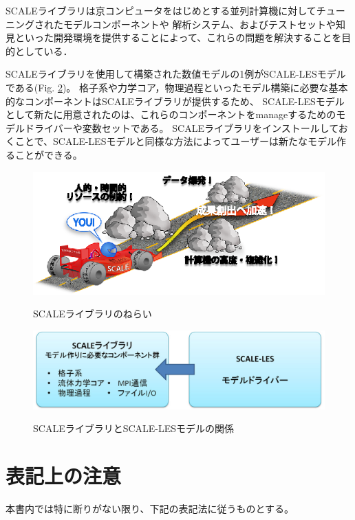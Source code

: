 SCALEライブラリは京コンピュータをはじめとする並列計算機に対してチューニングされたモデルコンポーネントや
解析システム、およびテストセットや知見といった開発環境を提供することによって、これらの問題を解決することを目的としている．

SCALEライブラリを使用して構築された数値モデルの1例がSCALE-LESモデルである(Fig. \ref{fig:scale-les})。
格子系や力学コア，物理過程といったモデル構築に必要な基本的なコンポーネントはSCALEライブラリが提供するため、
SCALE-LESモデルとして新たに用意されたのは、これらのコンポーネントをmanageするためのモデルドライバーや変数セットである。
SCALEライブラリをインストールしておくことで、SCALE-LESモデルと同様な方法によってユーザーは新たなモデル作ることができる。

\begin{figure}[t]
\begin{center}
  \includegraphics[width=0.6\hsize]{./figure/library.eps}\\
  \caption{SCALEライブラリのねらい}
  \label{fig:scale}
\end{center}
\end{figure}

\begin{figure}[t]
\begin{center}
  \includegraphics[width=0.9\hsize]{./figure/scale_and_scale-les.eps}\\
  \caption{SCALEライブラリとSCALE-LESモデルの関係}
  \label{fig:scale-les}
\end{center}
\end{figure}


\section{表記上の注意}

本書内では特に断りがない限り、下記の表記法に従うものとする。


